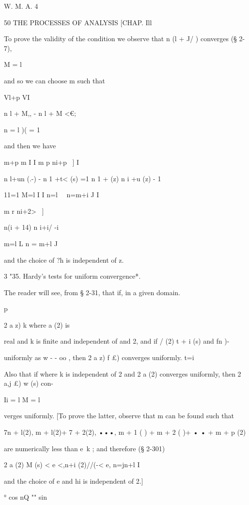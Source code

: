W. M. A. 4



50 THE PROCESSES OF ANALYSIS [CHAP. Ill

To prove the validity of the condition we observe that n (l + J/ )
converges (§ 2-7),

M = l

and so we can choose m such that

Vl+p VI

n l + M,, - n l + M <€;

n = l )( = 1

and then we have

m+p m I I m p ni+p ~] I

n l+un (.-) - n 1 +t< (s) =1 n 1 + (z) n i +u (z) - 1

11=1 M=l I I n=l \ \ n=m+i J I

m r ni+2> ~]

 n(i + 14) n i+i/ -i

m=l L n = m+l J

and the choice of ?h is independent of z.

3 "35. Hardy's tests for uniform convergence*.



The reader will see, from § 2-31, that if, in a given domain.



p



2 a z) k where a (2) is



real and k is finite and independent of and 2, and if / (2) t + i (s)
and fn )-

uniformly as w - - oo , then 2 a z) f £) converges uniformly. t=i

Also that if where k is independent of 2 and 2 a (2) converges
uniformly, then 2 a,j £) w (s) con-

Ii = l M = l

verges uniformly. [To prove the latter, observe that m can be found
such that

 7n + l(2), m + l(2)+ 7 + 2(2), •••, m + 1 ( ) + m + 2 ( )+ • • + m +
p (2)

are numerically less than e\ k ; and therefore (§ 2-301)

2 a (2) M (s) < e <,n+i (2)//(-< e, n=jn+l I

and the choice of e and hi is independent of 2.]



° cos nQ "" sin %

